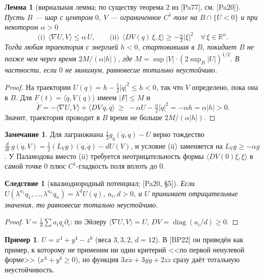 \documentclass[11pt,a4paper]{article}
\newtheorem{lemma}[theorem]{Лемма}
\newtheorem{corollary}[theorem]{Следствие}
\theoremstyle{definition}
\newtheorem{remark}[theorem]{Замечание}
\newtheorem{example}[theorem]{Пример}
\newcommand{\R}{\mathbb R}
\DeclareMathOperator{\diag}{diag}
\begin{document}
\begin{lemma}[вириальная лемма; по существу теорема 2 из {[Pa77]}, см. {[Pa20]}]\label{lem:virial}
Пусть $B$ --- шар с центром $0$, $V$ --- ограниченное $C^1$-поле на $B\cap\{U<0\}$ и при некотором
$\alpha>0$
\[
\text{(i)}\ \ \langle\nabla U,V\rangle\le\alpha\,U,\qquad
\text{(ii)}\ \ \langle DV(q)\,\xi,\xi\rangle\ge-\tfrac{\alpha}{2}|\xi|^2\quad\forall\,\xi\in\R^n .
\]
Тогда любая траектория с энергией $h<0$, стартовавшая в $B$, покидает $B$ не позже чем через время
$2M/(\alpha|h|)$, где $M=\sup|V|\cdot(2\sup_B|U|)^{1/2}$. В частности, если $0$ не минимум,
равновесие тотально неустойчиво.
\end{lemma}
\begin{proof}
На траектории $U(q)=h-\frac12|\dot q|^2\le h<0$, так что $V$ определено, пока она в $B$.
Для $F(t)=\langle\dot q,V(q)\rangle$ имеем $|F|\le M$ и
\[
\dot F=-\langle\nabla U,V\rangle+\langle DV\,\dot q,\dot q\rangle\ \ge\ -\alpha U-\tfrac\alpha2|\dot q|^2
=-\alpha h=\alpha|h|>0 .
\]
Значит, траектория проводит в $B$ время не больше $2M/(\alpha|h|)$.
\end{proof}

\begin{remark}
Для лагранжиана $\frac12 g_q(\dot q,\dot q)-U$ верно тождество
$\frac{d}{dt}\,g(\dot q,V)=\frac12(L_Vg)(\dot q,\dot q)-dU(V)$, и условие (ii) заменяется на
$L_Vg\ge-\alpha g$. У Паламодова вместо (ii) требуется неотрицательность формы $\langle DV(0)\xi,\xi\rangle$
в самой точке $0$ плюс $C^1$-гладкость поля вплоть до $0$.
\end{remark}

\begin{corollary}[квазиоднородный потенциал; {[Pa20, \S5]}]\label{cor:qh}
Если $U(\lambda^{a_1}q_1,\dots,\lambda^{a_n}q_n)=\lambda^dU(q)$, $a_i,d>0$, и $U$ принимает отрицательные
значения, то равновесие тотально неустойчиво.
\end{corollary}
\begin{proof}
$V=\frac1d\sum a_iq_i\partial_i$: по Эйлеру $\langle\nabla U,V\rangle=U$, $DV=\diag(a_i/d)\ge0$.
\end{proof}

\begin{example}
$U=x^4+y^4-z^6$ (веса $3,3,2$, $d=12$). В [BP22] он приведён как пример, к которому не применим ни один
критерий <<по первой ненулевой форме>> ($x^4+y^4\ge0$), но функция $3x\dot x+3y\dot y+2z\dot z$ сразу даёт
тотальную неустойчивость.
\end{example}
\end{document}
